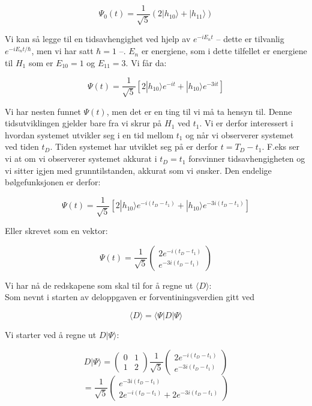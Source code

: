 \documentclass[a4paper,norsk, 10pt]{article}
\numberwithin{equation}{section}
\begin{document}
$$
\Psi_0(t) = \frac{1}{\sqrt{5}}(2|h_{10}\rangle + |h_{11}\rangle)
$$

Vi kan så legge til en tidsavhengighet ved hjelp av $e^{-iE_nt}$ -- dette er tilvanlig $e^{-iE_nt/\hbar}$, men vi har satt $\hbar = 1$ --. $E_n$ er energiene, som i dette tilfellet er energiene til $H_1$ som er $E_{10} = 1$ og $E_{11} = 3$. Vi får da:

$$
\Psi(t) = \frac{1}{\sqrt{5}}\left[2|h_{10}\rangle e^{-it} + |h_{10}\rangle e^{-3it}\right]
$$

Vi har nesten funnet $\Psi(t)$, men det er en ting til vi må ta hensyn til. Denne tidsutviklingen gjelder bare fra vi skrur på $H_1$ ved $t_1$. Vi er derfor interessert i hvordan systemet utvikler seg i en tid mellom $t_1$ og når vi observerer systemet ved tiden $t_D$. Tiden systemet har utviklet seg på er derfor $t = T_D - t_1$. F.eks ser vi at om vi observerer systemet akkurat i $t_D = t_1$ forsvinner tidsavhengigheten og vi sitter igjen med grunntilstanden, akkurat som vi ønsker. Den endelige bølgefunksjonen er derfor:

\begin{equation}
\Psi(t) = \frac{1}{\sqrt{5}}\left[2|h_{10}\rangle e^{-i(t_D - t_1)} + |h_{10}\rangle e^{-3i(t_D - t_1)}\right]
\label{eq:Psi(t)}
\end{equation}

Eller skrevet som en vektor:

$$
\Psi(t) = \frac{1}{\sqrt{5}}
\begin{pmatrix}
2e^{-i(t_D - t_1)}\\
e^{-3i(t_D - t_1)}
\end{pmatrix}
$$

Vi har nå de redskapene som skal til for å regne ut $\langle D \rangle$:\\

Som nevnt i starten av deloppgaven er forventiningsverdien gitt ved

$$
\langle D\rangle = \langle\Psi | D | \Psi \rangle
$$

Vi starter ved å regne ut $D|\Psi\rangle$:

$$
D|\Psi\rangle =
\begin{pmatrix}
0 &1\\1&2
\end{pmatrix}
\frac{1}{\sqrt{5}}
\begin{pmatrix}
2e^{-i(t_D - t_1)}\\
e^{-3i(t_D - t_1)}
\end{pmatrix}
$$
$$
= \frac{1}{\sqrt{5}}
\begin{pmatrix}
e^{-3i(t_D-t_1)}\\
2e^{-i(t_D-t_1)} + 2e^{-3i(t_D-t_1)}
\end{pmatrix}
$$
\end{document}
